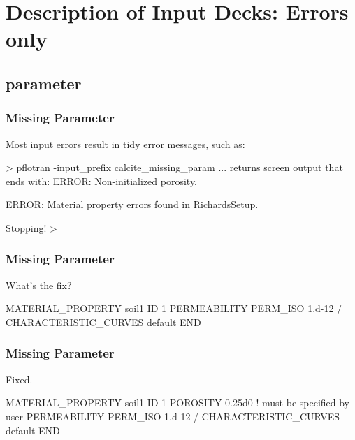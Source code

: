 \documentclass{beamer}
\newcommand\gehcomment[1]{{{\color{orange} #1}}}
\newcommand\redcomment[1]{{{\color{red} #1}}}
\newcommand\bluecomment[1]{{{\color{blue} #1}}}
\newcommand\magentacomment[1]{{{\color{magenta} #1}}}
\begin{document}
\section{Description of Input Decks: Errors only }

\subsection{parameter}

\begin{frame}\frametitle{Missing Parameter}
Most input errors result in tidy error messages, such as:
\begin{semiverbatim}

> pflotran -input_prefix calcite_missing_param
... \gehcomment{returns screen output that ends with:}
  ERROR: Non-initialized porosity.

  ERROR: Material property errors found in RichardsSetup.

  Stopping!
>
\end{semiverbatim}

\end{frame}

\begin{frame}\frametitle{Missing Parameter}
\redcomment{What's the fix?}
\begin{semiverbatim}

MATERIAL_PROPERTY soil1
  ID 1
  PERMEABILITY
    PERM_ISO 1.d-12
  /
  CHARACTERISTIC_CURVES default
END
\end{semiverbatim}

\end{frame}

\begin{frame}\frametitle{Missing Parameter}
\redcomment{Fixed.}
\begin{semiverbatim}

MATERIAL_PROPERTY soil1
  ID 1
  \magentacomment{POROSITY 0.25d0} \bluecomment{! must be specified by user}
  PERMEABILITY
    PERM_ISO 1.d-12
  /
  CHARACTERISTIC_CURVES default
END
\end{semiverbatim}

\end{frame}

\end{document}
